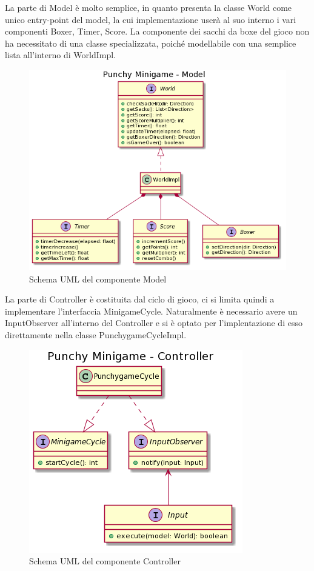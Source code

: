 \documentclass[a4paper,12pt]{report}
\begin{document}
	La parte di Model è molto semplice, in quanto presenta la classe World come unico entry-point del model, la cui implementazione userà al suo interno i vari componenti Boxer, Timer, Score. La componente dei sacchi da boxe del gioco non ha necessitato di una classe specializzata, poiché modellabile con una semplice lista all'interno di WorldImpl.\newline
    \begin{figure}[h]
        \centering{}
        \includegraphics[width=150mm]{images/picchiotti/punchymodel.png}
        \caption{Schema UML del componente Model}
        \label{img:punchymodel}
    \end{figure}
	La parte di Controller è costituita dal ciclo di gioco, ci si limita quindi a implementare l'interfaccia MinigameCycle.
    Naturalmente è necessario avere un InputObserver all'interno del Controller e si è optato per l'implentazione di esso direttamente nella classe PunchygameCycleImpl.
    \begin{figure}[!t]
        \centering{}
        \includegraphics{images/picchiotti/punchycontroller.png}
        \caption{Schema UML del componente Controller}
        \label{img:punchycontroller}
    \end{figure}
\end{document}
